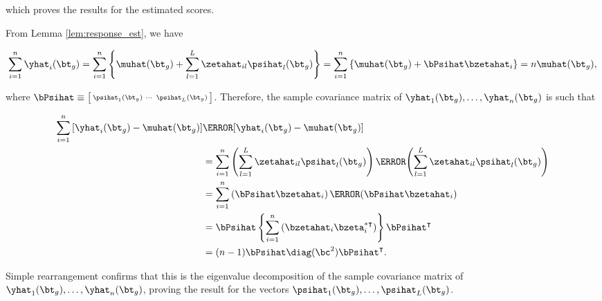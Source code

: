 \documentclass[12pt]{article}
\theoremstyle{plain}
\theoremstyle{definition}
\theoremstyle{remark}
\begin{document}
\noindent which proves the results for the estimated scores.

From Lemma \ref{lem:response_est}, we have

\[
	\sum_{i=1}^n \yhat_i (\bt_g)
		= \sum_{i=1}^n \left\{ \muhat (\bt_g) + \sum_{l=1}^L \zetahat_{il} \psihat_l (\bt_g) \right\}
		= \sum_{i=1}^n \left\{ \muhat (\bt_g) + \bPsihat \bzetahat_i \right\}
		= n \muhat (\bt_g),
\]

\noindent where $\bPsihat \equiv \bigl[ \begin{smallmatrix} \psihat_1 (\bt_g) & \cdots & \psihat_L (\bt_g)
\end{smallmatrix} \bigr]$.
Therefore, the sample covariance matrix of $\yhat_1 (\bt_g), \dots, \yhat_n (\bt_g)$ is such that

\begin{align*}
	\sum_{i=1}^n \left[ \yhat_i (\bt_g) - \muhat (\bt_g) \right] & \T{\left[ \yhat_i (\bt_g) - \muhat (\bt_g) \right]} \\
		&= \sum_{i=1}^n \left(
			\sum_{l=1}^L \zetahat_{il} \psihat_l (\bt_g)
		\right) \T{\left(
			\sum_{l=1}^L \zetahat_{il} \psihat_l (\bt_g)
		\right)} \\
		&= \sum_{i=1}^n \left( \bPsihat \bzetahat_i \right) \T{\left( \bPsihat \bzetahat_i \right)} \\
		&= \bPsihat \left\{ \sum_{i=1}^n \left( \bzetahat_i \bzeta^{*\intercal}_i \right) \right\} \bPsihat^{\intercal} \\
		&= (n - 1) \bPsihat \diag (\bc^2) \bPsihat^{\intercal}.
\end{align*}

\noindent Simple rearrangement confirms that this is the eigenvalue decomposition of
the sample covariance matrix of $\yhat_1 (\bt_g), \dots, \yhat_n (\bt_g)$, proving the result for the vectors
$\psihat_1 (\bt_g), \dots, \psihat_L (\bt_g)$.



























\end{document}
